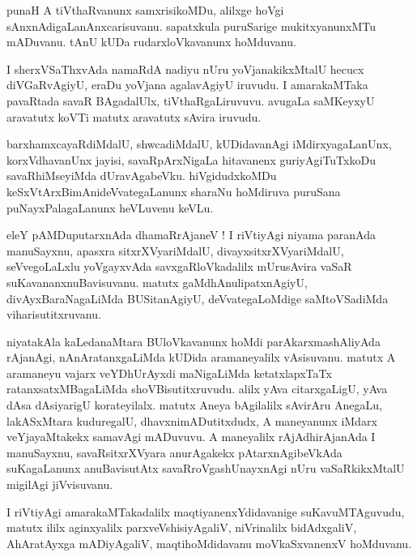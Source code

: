 \documentclass{article}
\begin{document}
\begin{mn}
punaH A tiVthaRvanunx samxrisikoMDu, alilxge hoVgi sAnxnAdigaLanAnxcarisuvanu. sapatxkula 
puruSarige mukitxyanunxMTu mADuvanu. tAnU kUDa rudarxloVkavanunx hoMduvanu.
\end{mn}

\begin{mn}
I sherxVSaThxvAda namaRdA nadiyu nUru yoVjanakikxMtalU hecucx diVGaRvAgiyU, eraDu yoVjana
agalavAgiyU iruvudu. I amarakaMTaka pavaRtada savaR BAgadalUlx, tiVthaRgaLiruvuvu. avugaLa 
saMKeyxyU aravatutx koVTi matutx aravatutx sAvira iruvudu. 
\end{mn}

\begin{mn}
barxhamxcayaRdiMdalU, shwcadiMdalU, kUDidavanAgi iMdirxyagaLanUnx, korxVdhavanUnx jayisi, 
savaRpArxNigaLa hitavanenx guriyAgiTuTxkoDu savaRhiMseyiMda dUravAgabeVku. hiVgidudxkoMDu 
keSxVtArxBimAnideVvategaLanunx sharaNu hoMdiruva puruSana puNayxPalagaLanunx heVLuvenu keVLu.
\end{mn}

\begin{mn}
eleY pAMDuputarxnAda dhamaRrAjaneV ! I riVtiyAgi niyama paranAda manuSayxnu, apasxra 
sitxrXVyariMdalU, divayxsitxrXVyariMdalU, seVvegoLaLxlu yoVgayxvAda savxgaRloVkadalilx 
mUrusAvira vaSaR suKavananxnuBavisuvanu. matutx gaMdhAnulipatxnAgiyU, divAyxBaraNagaLiMda 
BUSitanAgiyU, deVvategaLoMdige saMtoVSadiMda viharisutitxruvanu.
\end{mn}

\begin{mn}
niyatakAla kaLedanaMtara BUloVkavanunx hoMdi parAkarxmashAliyAda rAjanAgi, nAnAratanxgaLiMda kUDida
aramaneyalilx vAsisuvanu. matutx A aramaneyu vajarx veYDhUrAyxdi maNigaLiMda ketatxlapxTaTx 
ratanxsatxMBagaLiMda shoVBisutitxruvudu. alilx yAva citarxgaLigU, yAva dAsa dAsiyarigU korateyilalx.
matutx Aneya bAgilalilx sAvirAru AnegaLu, lakASxMtara kuduregalU, dhavxnimADutitxdudx, A 
maneyanunx iMdarx veYjayaMtakekx samavAgi mADuvuvu. A maneyalilx rAjAdhirAjanAda I manuSayxnu, 
savaRsitxrXVyara anurAgakekx pAtarxnAgibeVkAda suKagaLanunx anuBavisutAtx savaRroVgashUnayxnAgi nUru
vaSaRkikxMtalU migilAgi jiVvisuvanu.
\end{mn}

\begin{mn}
I riVtiyAgi amarakaMTakadalilx maqtiyanenxYdidavanige suKavuMTAguvudu, matutx ililx aginxyalilx
parxveVshisiyAgaliV, niVrinalilx  bidAdxgaliV, AhAratAyxga mADiyAgaliV, maqtihoMdidavanu 
moVkaSxvanenxV hoMduvanu.
\end{mn}
\end{document}
